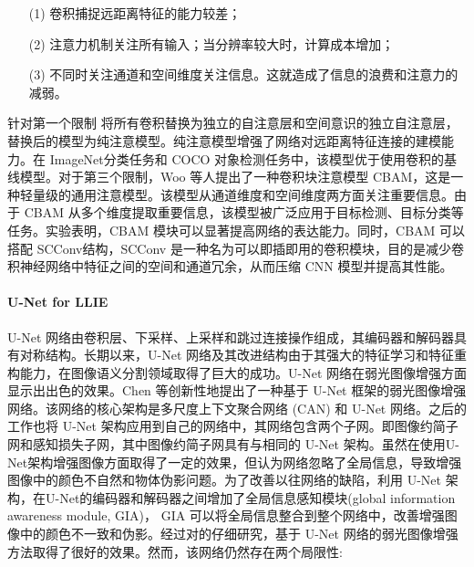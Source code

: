 \documentclass[a4paper]{ctexart}
\begin{document}
	\begin{itemize}
		\item[(1)] 
		卷积捕捉远距离特征的能力较差；
		
		\item[(2)]
		注意力机制关注所有输入；当分辨率较大时，计算成本增加；
		
		\item[(3)]
		不同时关注通道和空间维度关注信息。这就造成了信息的浪费和注意力的减弱。
	\end{itemize}	
	
	针对第一个限制 \cite{ramachandran2019stand} 将所有卷积替换为独立的自注意层和空间意识的独立自注意层，替换后的模型为纯注意模型。纯注意模型增强了网络对远距离特征连接的建模能力。在 ImageNet分类任务和 COCO 对象检测任务中，该模型优于使用卷积的基线模型。对于第三个限制，Woo 等人\cite{woo2018cbam}提出了一种卷积块注意模型 CBAM，这是一种轻量级的通用注意模型。该模型从通道维度和空间维度两方面关注重要信息。由于 CBAM 从多个维度提取重要信息，该模型被广泛应用于目标检测、目标分类等任务。实验表明，CBAM 模块可以显著提高网络的表达能力。同时，CBAM 可以搭配 SCConv\cite{li2023scconv}结构，SCConv 是一种名为可以即插即用的卷积模块，目的是减少卷积神经网络中特征之间的空间和通道冗余，从而压缩 CNN 模型并提高其性能。
	
	\paragraph{U-Net for LLIE}
	
	U-Net 网络由卷积层、下采样、上采样和跳过连接操作组成，其编码器和解码器具有对称结构。长期以来，U-Net 网络及其改进结构由于其强大的特征学习和特征重构能力，在图像语义分割领域取得了巨大的成功。U-Net 网络在弱光图像增强方面显示出出色的效果。Chen 等\cite{chen2018learning}创新性地提出了一种基于 U-Net 框架的弱光图像增强网络。该网络的核心架构是多尺度上下文聚合网络 (CAN) 和 U-Net 网络。之后的工作\cite{chen2018learning, zamir2021learning}也将 U-Net 架构应用到自己的网络中，其网络包含两个子网。即图像约简子网和感知损失子网，其中图像约简子网具有与\cite{chen2018learning}相同的 U-Net 架构。虽然\cite{chen2018learning, zamir2021learning}在使用U-Net架构增强图像方面取得了一定的效果，但\cite{meng2020gia}认为\cite{chen2018learning, zamir2021learning}网络忽略了全局信息，导致增强图像中的颜色不自然和物体伪影问题。为了改善以往网络的缺陷，利用 U-Net 架构，\cite{meng2020gia}在U-Net的编码器和解码器之间增加了全局信息感知模块(global information awareness module, GIA)， GIA 可以将全局信息整合到整个网络中，改善增强图像中的颜色不一致和伪影。经过对\cite{chen2018learning, meng2020gia, zamir2021learning}的仔细研究，基于 U-Net 网络的弱光图像增强方法取得了很好的效果。然而，该网络仍然存在两个局限性:
	
\end{document}
